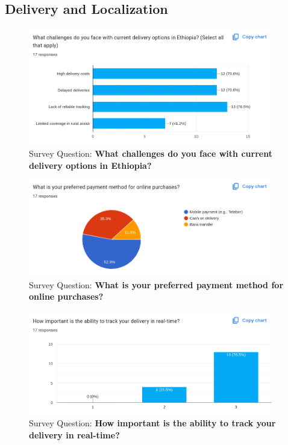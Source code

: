 \documentclass[12pt]{report}
\begin{document}
\begin{appendices}
	\section {Delivery and Localization}

	\begin{figure}[H]
		\begin{center}
			\includegraphics[width=0.95\textwidth]{survey/q18}
		\end{center}
		\caption{Survey Question: \textbf{What challenges do you face with current delivery options in Ethiopia?}}
	\end{figure}

	\begin{figure}[H]
		\begin{center}
			\includegraphics[width=0.95\textwidth]{survey/q19}
		\end{center}
		\caption{Survey Question: \textbf{What is your preferred payment method for online purchases?}}
	\end{figure}


	\begin{figure}[H]
		\begin{center}
			\includegraphics[width=0.95\textwidth]{survey/q20}
		\end{center}
		\caption{Survey Question: \textbf{How important is the ability to track your delivery in real-time?}}
	\end{figure}


\end{appendices}
\end{document}
